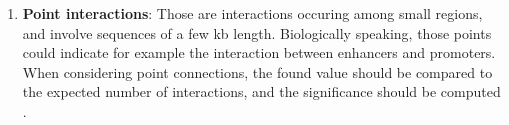 \begin{enumerate}
    \item \textbf{Point interactions}: Those are interactions occuring among small regions, and involve sequences of a few kb length. Biologically speaking, those points could indicate for example the interaction between enhancers and promoters. When considering point connections, the found value should be compared to the expected number of interactions, and the significance should be computed
    \cite{lajoieHitchhikerGuideHiC2015}.
\end{enumerate}

